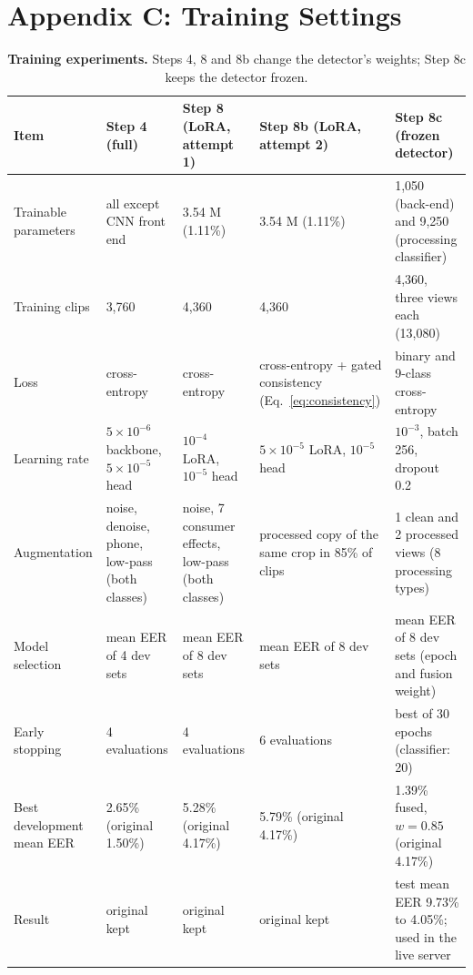 \documentclass[10pt,a4paper,twocolumn]{article}
\begin{document}
\section{Appendix C: Training Settings}
\begin{table}[H]
\centering\small
\caption{\textbf{Training experiments.} Steps 4, 8 and 8b change the detector's weights; Step 8c keeps the detector frozen.}
\label{tab:train}
\begin{tabular}{@{}p{}p{}p{}p{}p{}@{}}
\toprule
\textbf{Item} & \textbf{Step 4 (full)} & \textbf{Step 8 (LoRA, attempt 1)} & \textbf{Step 8b (LoRA, attempt 2)} & \textbf{Step 8c (frozen detector)}\\
\midrule
Trainable parameters & all except CNN front end & 3.54 M (1.11\%) & 3.54 M (1.11\%) & 1,050 (back-end) and 9,250 (processing classifier)\\
Training clips & 3,760 & 4,360 & 4,360 & 4,360, three views each (13,080)\\
Loss & cross-entropy & cross-entropy & cross-entropy + gated consistency (Eq.~\ref{eq:consistency}) & binary and 9-class cross-entropy\\
Learning rate & $5\times10^{-6}$ backbone, $5\times10^{-5}$ head & $10^{-4}$ LoRA, $10^{-5}$ head & $5\times10^{-5}$ LoRA, $10^{-5}$ head & $10^{-3}$, batch 256, dropout 0.2\\
Augmentation & noise, denoise, phone, low-pass (both classes) & noise, 7 consumer effects, low-pass (both classes) & processed copy of the same crop in 85\% of clips & 1 clean and 2 processed views (8 processing types)\\
Model selection & mean EER of 4 dev sets & mean EER of 8 dev sets & mean EER of 8 dev sets & mean EER of 8 dev sets (epoch and fusion weight)\\
Early stopping & 4 evaluations & 4 evaluations & 6 evaluations & best of 30 epochs (classifier: 20)\\
Best development mean EER & 2.65\% (original 1.50\%) & 5.28\% (original 4.17\%) & 5.79\% (original 4.17\%) & 1.39\% fused, $w=0.85$ (original 4.17\%)\\
Result & original kept & original kept & original kept & test mean EER 9.73\% to 4.05\%; used in the live server\\
\bottomrule
\end{tabular}
\end{table}
\end{document}

